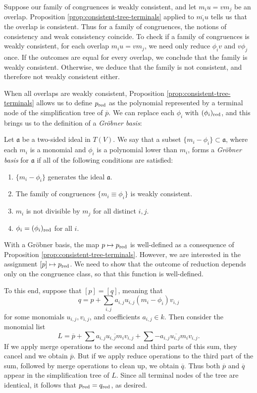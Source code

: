 Suppose our family of congruences is weakly consistent, and let $m_i u = v m_j$ be an overlap. Proposition \ref{prop:consistent-tree-terminals} applied to $\overline{m_i u}$ tells us that the overlap is consistent. Thus for a family of congruences, the notions of consistency and weak consistency coincide. To check if a family of congruences is weakly consistent, for each overlap $m_i u = v m_j$, we need only reduce $\phi_i v$ and $v \phi_j$ once. If the outcomes are equal for every overlap, we conclude that the family is weakly consistent. Otherwise, we deduce that the family is not consistent, and therefore not weakly consistent either.

When all overlaps are weakly consistent, Proposition \ref{prop:consistent-tree-terminals} allows us to define $p_{\mathrm{red}}$ as the polynomial represented by a terminal node of the simplification tree of $\overline{p}$. We can replace each $\phi_i$ with $(\phi_i)_{\mathrm{red}}$, and this brings us to the definition of a \emph{Gr\"obner basis}:
\begin{defn}\label{def:grobner}
	Let $\mathfrak{a}$ be a two-sided ideal in $T(V)$. We say that a subset $\{m_i - \phi_i\}\subset \mathfrak{a}$, where each $m_i$ is a monomial and $\phi_i$ is a polynomial lower than $m_i$, forms a \emph{Gr\"obner basis} for $\mathfrak{a}$ if all of the following conditions are satisfied:
	\begin{enumerate}
		\item $\{m_i - \phi_i\}$ generates the ideal $\mathfrak{a}$.
		\item\label{item:grobnerconsistent} The family of congruences $\{m_i \equiv \phi_i\}$ is weakly consistent.
		\item\label{item:reduced-1} $m_i$ is not divisible by $m_j$ for all distinct $i,j$.
		\item\label{item:reduced-2} $\phi_i = (\phi_i)_{\mathrm{red}}$ for all $i$.
	\end{enumerate}
\end{defn}
With a Gr\"obner basis, the map $p\mapsto p_{\mathrm{red}}$ is well-defined as a consequence of Proposition \ref{prop:consistent-tree-terminals}. However, we are interested in the assignment $[p]\mapsto p_{\mathrm{red}}$. We need to show that the outcome of reduction depends only on the congruence class, so that this function is well-defined.

To this end, suppose that $[p] = [q]$, meaning that
\[
	q = p + \sum_{i,j} a_{i,j}u_{i,j} (m_i - \phi_i) v_{i,j}
\]
for some monomials $u_{i,j}, v_{i,j}$, and coefficients $a_{i,j}\in k$. Then consider the monomial list
\[
	L= \overline{p} + \sum \overline{a_{i,j}u_{i,j}m_iv_{i,j}} + \sum \overline{-a_{i,j}u_{i,j}m_i v_{i,j}}.
\]
If we apply merge operations to the second and third parts of this sum, they cancel and we obtain $\overline{p}$. But if we apply reduce operations to the third part of the sum, followed by merge operations to clean up, we obtain $\overline{q}$. Thus both $\overline{p}$ and $\overline{q}$ appear in the simplification tree of $L$. Since all terminal nodes of the tree are identical, it follows that $p_{\mathrm{red}} = q_{\mathrm{red}}$, as desired.

